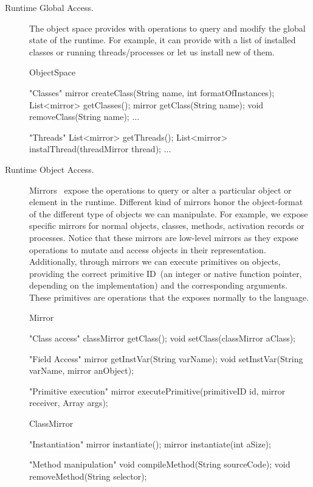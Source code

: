 \begin{description}
\item[Runtime Global Access.] The object space provides with operations to query and modify the global state of the runtime. For example, it can provide with a list of installed classes or running threads/processes or let us install new of them.

\begin{code}
ObjectSpace {
    "Classes"
    mirror createClass(String name, int formatOfInstances);
    List<mirror> getClasses();
    mirror getClass(String name);
    void removeClass(String name);
    ...

    "Threads"
    List<mirror> getThreads();
    List<mirror> instalThread(threadMirror thread);
    ...
}
\end{code}

\item[Runtime Object Access.] Mirrors~\cite{Brac04b} expose the operations to query or alter a particular object or element in the runtime. Different kind of mirrors honor the object-format of the different type of objects we can manipulate. For example, we expose specific mirrors for normal objects, classes, methods, activation records or processes. Notice that these mirrors are low-level mirrors as they expose operations to mutate and access objects in their \VM representation. Additionally, through mirrors we can execute \VM primitives on objects, providing the correct primitive ID~(an integer or native function pointer, depending on the implementation) and the corresponding arguments. These primitives are operations that the \VM exposes normally to the language.

\begin{code}
Mirror {
    "Class access"
    classMirror getClass();
    void setClass(classMirror aClass);

    "Field Access"
    mirror getInstVar(String varName);
    void setInstVar(String varName, mirror anObject);
    
    "Primitive execution"
    mirror executePrimitive(primitiveID id, mirror receiver, Array args);
}

ClassMirror {
    "Instantiation"
    mirror instantiate();
    mirror instantiate(int aSize);

    "Method manipulation"    
    void compileMethod(String sourceCode);
    void removeMethod(String selector);
}
\end{code}

\end{description}

